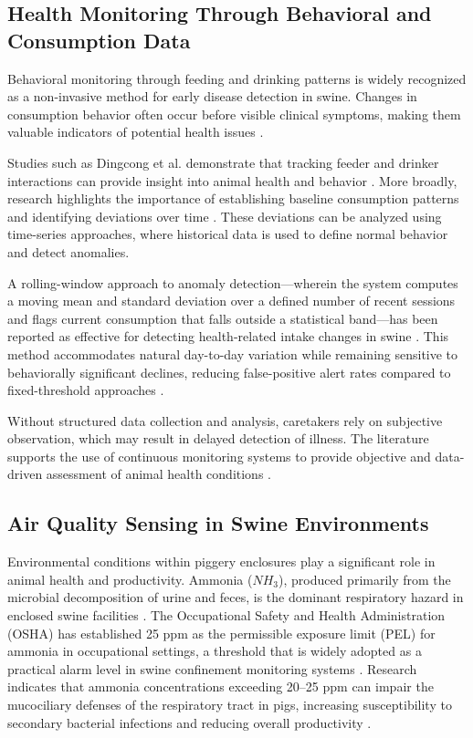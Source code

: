 \subsection{Health Monitoring Through Behavioral and Consumption Data}

Behavioral monitoring through feeding and drinking patterns is widely recognized as a non-invasive method for early disease detection in swine. Changes in consumption behavior often occur before visible clinical symptoms, making them valuable indicators of potential health issues \cite{dingcong2017monitoring, sadeghi2023improving}.

Studies such as Dingcong et al. demonstrate that tracking feeder and drinker interactions can provide insight into animal health and behavior \cite{dingcong2017monitoring}. More broadly, research highlights the importance of establishing baseline consumption patterns and identifying deviations over time \cite{sadeghi2023improving, racewicz2021welfare}. These deviations can be analyzed using time-series approaches, where historical data is used to define normal behavior and detect anomalies.

A rolling-window approach to anomaly detection---wherein the system computes a moving mean and standard deviation over a defined number of recent sessions and flags current consumption that falls outside a statistical band---has been reported as effective for detecting health-related intake changes in swine \cite{sadeghi2023improving, racewicz2021welfare}. This method accommodates natural day-to-day variation while remaining sensitive to behaviorally significant declines, reducing false-positive alert rates compared to fixed-threshold approaches \cite{sadeghi2023improving}.

Without structured data collection and analysis, caretakers rely on subjective observation, which may result in delayed detection of illness. The literature supports the use of continuous monitoring systems to provide objective and data-driven assessment of animal health conditions \cite{dingcong2017monitoring, racewicz2021welfare}.

\subsection{Air Quality Sensing in Swine Environments}

Environmental conditions within piggery enclosures play a significant role in animal health and productivity. Ammonia ($NH_3$), produced primarily from the microbial decomposition of urine and feces, is the dominant respiratory hazard in enclosed swine facilities \cite{purdue2019ammonia, pig2013airquality}. The Occupational Safety and Health Administration (OSHA) has established 25 ppm as the permissible exposure limit (PEL) for ammonia in occupational settings, a threshold that is widely adopted as a practical alarm level in swine confinement monitoring systems \cite{purdue2019ammonia, pig2013airquality}. Research indicates that ammonia concentrations exceeding 20--25 ppm can impair the mucociliary defenses of the respiratory tract in pigs, increasing susceptibility to secondary bacterial infections and reducing overall productivity \cite{purdue2019ammonia, sadeghi2023improving}.

